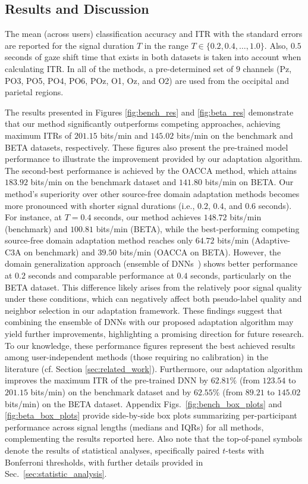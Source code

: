 \documentclass[12pt]{iopart}
\begin{document}
\subsection{Results and Discussion}
The mean (across users) classification accuracy and  ITR with the standard errors are reported for the signal duration $T$ in the range $T \in \{0.2,0.4,\dots,1.0\}$. Also, $0.5$ seconds of gaze shift time that exists in both datasets is taken into account when calculating ITR. In all of the methods, a pre-determined set of $9$ channels (Pz, PO3, PO5, PO4, PO6, POz, O1, Oz, and O2) are used from the occipital and parietal regions. 

{The results presented in Figures \ref{fig:bench_res} and \ref{fig:beta_res} demonstrate that our method significantly outperforms competing approaches, achieving maximum ITRs of $201.15$ bits/min and $145.02$ bits/min on the benchmark and BETA datasets, respectively. These figures also present the pre-trained model performance to illustrate the improvement provided by our adaptation algorithm. The second-best performance is achieved by the OACCA method, which attains $183.92$ bits/min on the benchmark dataset and $141.80$ bits/min on BETA. Our method's superiority over other source-free domain adaptation methods becomes more pronounced with shorter signal durations (i.e., $0.2$, $0.4$, and $0.6$ seconds). For instance, at $T=0.4$ seconds, our method achieves $148.72$ bits/min (benchmark) and $100.81$ bits/min (BETA), while the best-performing competing source-free domain adaptation method reaches only $64.72$ bits/min (Adaptive-C3A on benchmark) and $39.50$ bits/min (OACCA on BETA). However, the domain generalization approach (ensemble of DNNs~\cite{our_ensemble}) shows better performance at $0.2$ seconds and comparable performance at $0.4$ seconds, particularly on the BETA dataset. This difference likely arises from the relatively poor signal quality under these conditions, which can negatively affect both pseudo-label quality and neighbor selection in our adaptation framework. These findings suggest that combining the ensemble of DNNs with our proposed adaptation algorithm may yield further improvements, highlighting a promising direction for future research. To our knowledge, these performance figures represent the best achieved results among user-independent methods (those requiring no calibration) in the literature (cf. Section \ref{sec:related_work}). Furthermore, our adaptation algorithm improves the maximum ITR of the pre-trained DNN by $62.81\%$ (from $123.54$ to $201.15$ bits/min) on the benchmark dataset and by $62.55\%$ (from $89.21$ to $145.02$ bits/min) on the BETA dataset. Appendix Figs.~\ref{fig:bench_box_plots} and \ref{fig:beta_box_plots} provide side-by-side box plots summarizing per-participant performance across signal lengths (medians and IQRs) for all methods, complementing the results reported here. Also note that the top-of-panel symbols denote the results of statistical analyses, specifically paired $t$-tests with Bonferroni thresholds, with further details provided in Sec.~\ref{sec:statistic_analysis}.}
\end{document}
